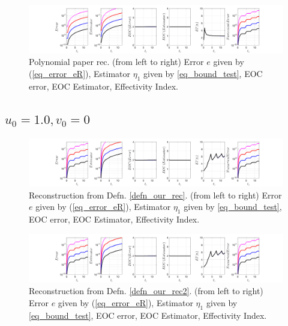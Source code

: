 \documentclass[12pt,a4paper]{article}
\numberwithin{equation}{section}
\theoremstyle{definition}
\begin{document}
\begin{figure}[H]
	\hspace{-3cm}
	\includegraphics[scale=0.55]{fig_LeapFrogplots_1x5_sin_IC_harmonic_u9_v1_paperrec_poly}	
	\caption{Polynomial paper rec. (from left to right) Error $e$ given by (\ref{eq_error_eR}), Estimator $\eta_1$ given by \ref{eq_bound_test},   EOC error, EOC Estimator, Effectivity Index.}
	\label{fig_all_in_one_paperrec_poly_u09_v01}
\end{figure}


\subsection*{$u_0=1.0, v_0= 0$}
\begin{figure}[H]
	\hspace{-3cm}
	\includegraphics[scale=0.55]{fig_LeapFrogplots_1x5_sin_IC_harmonic_order_2_u10_v0_rec_george}	
	\caption{Reconstruction from Defn. \ref{defn_our_rec}. (from left to right) Error $e$ given by (\ref{eq_error_eR}), Estimator $\eta_1$ given by \ref{eq_bound_test},  EOC error, EOC Estimator, Effectivity Index.}
	\label{fig_all_in_one_our_rec_george_u10_v0}
\end{figure}
\begin{figure}[H]
	\hspace{-3cm}
	\includegraphics[scale=0.55]{fig_LeapFrogplots_1x5_sin_IC_harmonic_order_2_u10_v0_rec2}	
	\caption{Reconstruction from Defn. \ref{defn_our_rec2}. (from left to right) Error $e$ given by (\ref{eq_error_eR}), Estimator $\eta_1$ given by \ref{eq_bound_test},   EOC error, EOC Estimator, Effectivity Index.}
	\label{fig_all_in_one_our_rec_2_u10_v0}
\end{figure}
\end{document}
